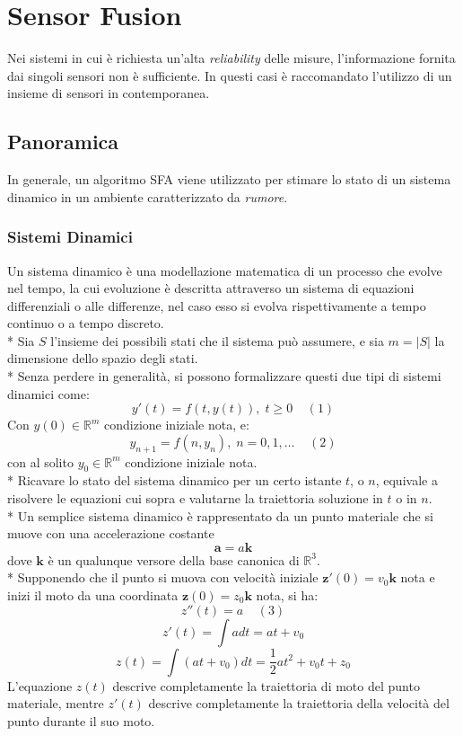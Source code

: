 \chapter{Sensor Fusion}
Nei sistemi in cui \`e richiesta un'alta \emph{reliability} delle misure, l'informazione fornita dai singoli sensori non \`e sufficiente. In questi casi \`e raccomandato l'utilizzo di un insieme di sensori in contemporanea. \cite{sfarailway}
\section{Panoramica}
In generale, un algoritmo SFA viene utilizzato per stimare lo stato di un sistema dinamico in un ambiente caratterizzato da \emph{rumore}. \cite{kfbook}
\subsection{Sistemi Dinamici}
Un sistema dinamico \`e una modellazione matematica di un processo che evolve nel tempo, la cui evoluzione \`e descritta attraverso un sistema di equazioni differenziali o alle differenze, nel caso esso si evolva rispettivamente a tempo continuo o a tempo discreto.\\*
Sia $S$ l'insieme dei possibili stati che il sistema pu\`o assumere, e sia $m = |S|$ la dimensione dello spazio degli stati.\\*
Senza perdere in generalit\`a, si possono formalizzare questi due tipi di sistemi dinamici come:
$$
y'(t) = f(t,y(t)),\;t\ge 0\;\;\;\;(1)
$$
Con $y(0) \in \mathbb{R}^m$ condizione iniziale nota, e:
$$
y_{n+1} = f(n,y_n),\;n = 0,1,\dots\;\;\;\;(2)
$$
con al solito $y_0 \in \mathbb{R}^m$ condizione iniziale nota\;\cite{gigi}.\\*
Ricavare lo stato del sistema dinamico per un certo istante $t$, o $n$, equivale a risolvere le equazioni cui sopra e valutarne la traiettoria soluzione in $t$ o in $n$.\\*
Un semplice sistema dinamico \`e rappresentato da un punto materiale che si muove con una accelerazione costante $$\mathbf{a} = a\mathbf{k}$$ dove $\mathbf{k}$ \`e un qualunque versore della base canonica di $\mathbb{R}^3$.\\*
Supponendo che il punto si muova con velocit\`a iniziale $\mathbf{z'}(0) = v_0\mathbf{k}$ nota e inizi il moto da una coordinata $\mathbf z(0) = z_0\mathbf{k}$ nota, si ha:
$$
z''(t) = a\;\;\;\;(3)
$$
$$
z'(t) = \int{a dt} = a t + v_0
$$
$$
z(t) = \int(a t + v_0)dt = \frac{1}{2} at^2 +  v_0 t + z_0
$$
L'equazione $z(t)$ descrive completamente la traiettoria di moto del punto materiale, mentre $z'(t)$ descrive completamente la traiettoria della velocit\`a del punto durante il suo moto.
